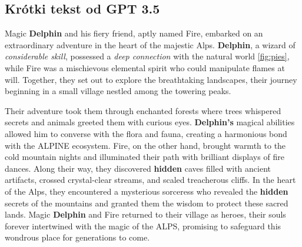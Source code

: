 \subsection{Krótki tekst od GPT 3.5}
    \begin{group}
    
    Magic \textbf{Delphin} and his fiery friend, aptly named Fire, embarked on an extraordinary adventure in the heart of the majestic Alps. \textbf{Delphin}, a wizard of \textit{considerable skill}, possessed a \textit{deep connection} with the natural world \ref{fig:pies}, while Fire was a mischievous elemental spirit who could manipulate flames at will. Together, they set out to explore the breathtaking landscapes, their journey beginning in a small village nestled among the towering peaks.
    
\vspace{.5cm}

    Their adventure took them through enchanted forests where trees whispered secrets and animals greeted them with curious eyes. \textbf{Delphin's} magical abilities allowed him to converse with the flora and fauna, creating a harmonious bond with the ALPINE ecosystem. Fire, on the other hand, brought warmth to the cold mountain nights and illuminated their path with brilliant displays of fire dances. Along their way, they discovered \textbf{hidden} caves filled with ancient artifacts, crossed crystal-clear streams, and scaled treacherous cliffs. In the heart of the Alps, they encountered a mysterious sorceress who revealed the \textbf{hidden} secrets of the mountains and granted them the wisdom to protect these sacred lands. Magic \textbf{Delphin} and Fire returned to their village as heroes, their souls forever intertwined with the magic of the ALPS, promising to safeguard this wondrous place for generations to come.
    
    \end{group}



%